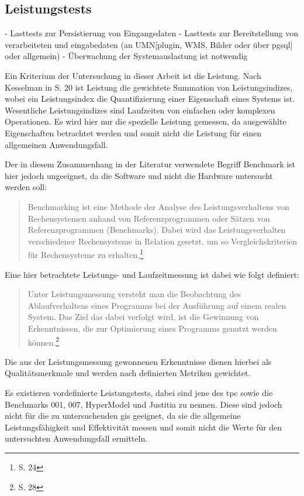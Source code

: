 
\subsection{Leistungstests}
\label{Leistungstests}

- Lasttests zur Persistierung von Eingangsdaten
- Lasttests zur Bereitstellung von verarbeiteten und eingabedaten (an UMN[plugin, WMS, Bilder oder über pgsql] oder allgemein)
- Überwachung der Systemauslastung ist notwendig

Ein Kriterium der Untersuchung in dieser Arbeit ist die Leistung.
Nach Kesselman in \cite{book:Leistungsanalyse} S. 20 ist Leistung die gewichtete Summation von Leistungsindizes, wobei ein Leistungsindex die Quantifizierung einer Eigenschaft eines Systems ist.
Wesentliche Leistungsindizes sind Laufzeiten von einfachen oder komplexen Operationen.
Es wird hier nur die spezielle Leistung gemessen, da ausgewählte Eigenschaften betrachtet werden und somit nicht die Leistung für einen allgemeinen Anwendungsfall.

Der in diesem Zusammenhang in der Literatur verwendete Begriff Benchmark ist hier jedoch ungeeignet, da die Software und nicht die Hardware untersucht werden soll:
\begin {quote}
Benchmarking ist eine Methode der Analyse des Leistungsverhaltens von Rechensystemen anhand von Referenzprogrammen oder Sätzen von Referenzprogrammen (Benchmarks). Dabei wird das Leistungsverhalten verschiedener Rechensysteme in Relation gesetzt, um so Vergleichskriterien  für Rechensysteme zu erhalten.\footnote{\cite{book:Leistungsanalyse} S. 24}
\end{quote}
Eine hier betrachtete Leistungs- und Laufzeitmessung ist dabei wie folgt definiert:
\begin {quote}
Unter Leistungsmessung versteht man die Beobachtung des Ablaufverhaltens eines Programms bei der Ausführung auf einem realen System. Das Ziel das dabei verfolgt wird, ist die Gewinnung von Erkenntnissen, die zur Optimierung eines Programms genutzt werden können.\footnote{\cite{book:Leistungsanalyse} S. 28}
\end{quote}
Die aus der Leistungsmessung gewonnenen Erkenntnisse dienen hierbei als Qualitätsmerkmale und werden nach definierten Metriken gewichtet.

Es existieren vordefinierte Leistungstests, dabei sind jene des \Gls{tpc} sowie die Benchmarks 001, 007, HyperModel und Justitia zu nennen.
Diese sind jedoch nicht für die zu untersuchenden \Gls{gis} geeignet, da sie die allgemeine Leistungsfähigkeit und Effektivität messen und somit nicht die Werte für den untersuchten Anwendungsfall ermitteln.